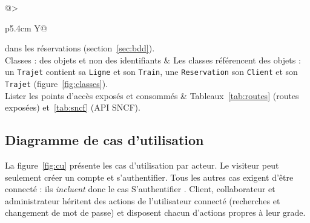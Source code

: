 \documentclass[11pt,a4paper]{article}
\newcommand{\code}[1]{\texttt{#1}}
\begin{document}
\begin{table}[H]
\begin{tabularx}{\textwidth}{@{}>{\raggedright\arraybackslash}p{5.4cm} Y@{}}
                        dans les réservations (section~\ref{sec:bdd}). \\
Classes : des objets et non des identifiants & Les classes référencent des objets : un
                        \code{Trajet} contient sa \code{Ligne} et son \code{Train}, une
                        \code{Reservation} son \code{Client} et son \code{Trajet}
                        (figure~\ref{fig:classes}). \\
Lister les points d'accès exposés et consommés & Tableaux~\ref{tab:routes} (routes exposées)
                        et~\ref{tab:sncf} (API SNCF). \\
\bottomrule
\end{tabularx}
\caption{Retours sur le dossier d'analyse et corrections}\label{tab:retours}
\end{table}

\subsection{Diagramme de cas d'utilisation}

La figure~\ref{fig:cu} présente les cas d'utilisation par acteur. Le visiteur peut seulement créer
un compte et s'authentifier. Tous les autres cas exigent d'être connecté : ils \emph{incluent} donc
le cas \og S'authentifier \fg. Client, collaborateur et administrateur héritent des actions de
l'utilisateur connecté (recherches et changement de mot de passe) et disposent chacun d'actions
propres à leur grade.
\end{document}
